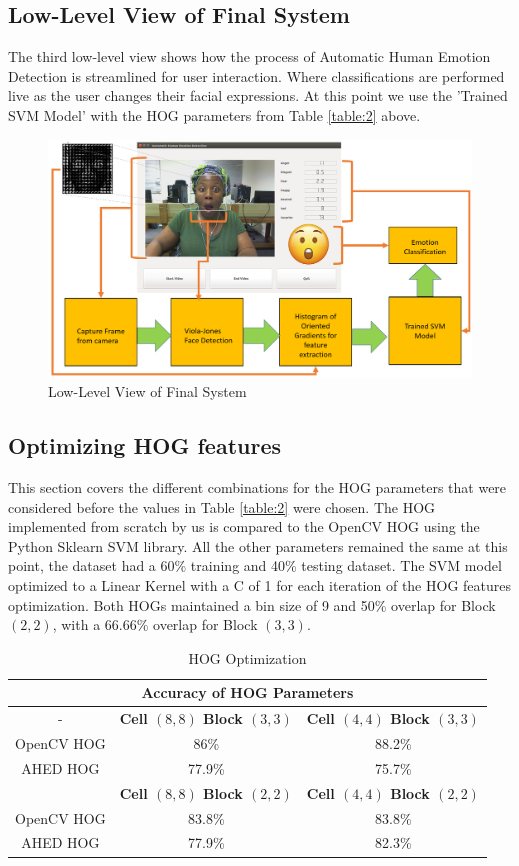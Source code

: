 \subsection{Low-Level View of Final System}
The third low-level view shows how the process of Automatic Human Emotion Detection is streamlined for user interaction. Where classifications are performed live as the user changes their facial expressions. At this point we use the 'Trained SVM Model' with the HOG parameters from Table \ref{table:2} above.
\begin{figure}[H]
  \centering
  \includegraphics[scale=0.6]{demo}
  \caption{Low-Level View of Final System}
  \label{fig: lowlevel3}
\end{figure} 

\subsection{Optimizing HOG features}
This section covers the different combinations for the HOG parameters that were considered before the values in Table \ref{table:2} were chosen. The HOG implemented from scratch by us is compared to the OpenCV HOG using the Python Sklearn SVM library. All the other parameters remained the same at this point, the dataset had a 60\% training and 40\% testing dataset. The SVM model optimized to a Linear Kernel with a C of 1 for each iteration of the HOG features optimization. Both HOGs maintained a bin size of 9 and 50\% overlap for Block $(2,2)$, with a 66.66\% overlap for Block $(3,3)$.
\begin{table}[H]
\centering
\begin{tabular}{ |c||c|c|}
	\hline
	\multicolumn{3}{|c|}{\textbf{Accuracy of HOG Parameters}}\\
	\hline
	- & \textbf{Cell $(8,8)$ Block $(3,3)$} & \textbf{Cell $(4,4)$ Block $(3,3)$}\\
	\hline
	OpenCV HOG & 86\% & 88.2\% \\
	\hline
	AHED HOG & 77.9\% & 75.7\% \\
	\hline
	& \textbf{Cell $(8,8)$ Block $(2,2)$} & \textbf{Cell $(4,4)$ Block $(2,2)$}\\
	\hline
	OpenCV HOG & 83.8\% & 83.8\% \\
	\hline
	AHED HOG & 77.9\% & 82.3\% \\
	\hline
\end{tabular}
\caption{HOG Optimization}
\label{table:class}
\end{table}

